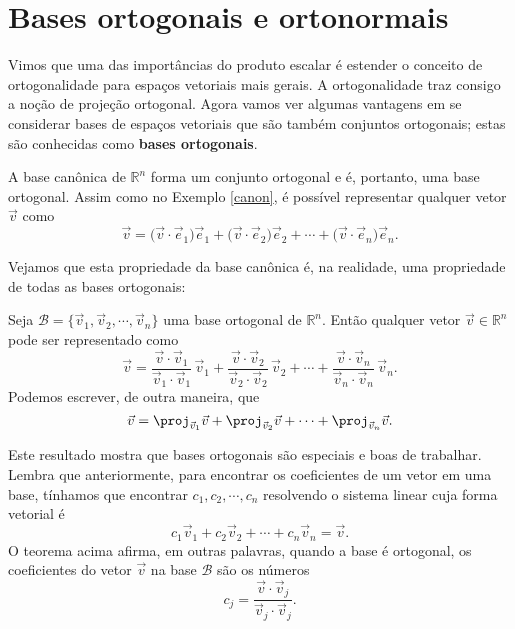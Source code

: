 \construirExer

\section{Bases ortogonais e ortonormais}


Vimos que uma das importâncias do produto escalar é estender o conceito de ortogonalidade para espaços vetoriais mais gerais. A ortogonalidade traz consigo a noção de projeção ortogonal. Agora vamos ver algumas vantagens em se considerar bases de espaços vetoriais que são também conjuntos ortogonais; estas são conhecidas como \textbf{bases ortogonais}.

\begin{ex}\label{ortonormal}
	A base canônica de $\mathbb{R}^n$ forma um conjunto ortogonal e é, portanto, uma base ortogonal. Assim como no Exemplo \ref{canon}, é possível representar qualquer vetor $\vec{v}$ como
	\begin{equation}
	\vec{v} = \big( \vec{v} \cdot \vec{e}_1 \big) \vec{e}_1 + \big( \vec{v} \cdot \vec{e}_2 \big) \vec{e}_2  + \cdots  + \big( \vec{v} \cdot \vec{e}_n \big) \vec{e}_n.
	\end{equation}
\end{ex}

Vejamos que esta propriedade da base canônica é, na realidade, uma propriedade de todas as bases ortogonais:

\begin{teo}\label{thm:base-ortogonal}
	Seja $\mathcal{B} = \{ \vec{v}_1, \vec{v}_2, \cdots, \vec{v}_n\}$ uma base ortogonal de $\mathbb{R}^n$. Então qualquer vetor $\vec{v} \in \mathbb{R}^n$ pode ser representado como
	\begin{equation}
	\vec{v} = \frac{\vec{v} \cdot \vec{v}_1}{\vec{v}_1 \cdot \vec{v}_1} \, \vec{v}_1 + \frac{\vec{v} \cdot \vec{v}_2}{\vec{v}_2 \cdot \vec{v}_2} \, \vec{v}_2  + \cdots  + \frac{\vec{v} \cdot \vec{v}_n}{\vec{v}_n \cdot \vec{v}_n} \, \vec{v}_n.
	\end{equation} Podemos escrever, de outra maneira, que
	\begin{equation}
	\vec{v} = \proj_{\vec{v}_1} \vec{v} +  \proj_{\vec{v}_2} \vec{v}  + \cdots  + \proj_{\vec{v}_n} \vec{v}.
	\end{equation}
\end{teo}

Este resultado mostra que bases ortogonais são especiais e boas de trabalhar. Lembra que anteriormente, para encontrar os coeficientes de um vetor em uma base, tínhamos que encontrar $c_1, c_2, \cdots, c_n$ resolvendo o sistema linear cuja forma vetorial é
\begin{equation}
c_1 \vec{v}_1 + c_2 \vec{v}_2 + \cdots + c_n \vec{v}_n = \vec{v}.
\end{equation} O teorema acima afirma, em outras palavras, quando a base é ortogonal, os coeficientes do vetor $\vec{v}$ na base $\mathcal{B}$ são os números
\begin{equation}
c_j = \frac{\vec{v} \cdot \vec{v}_j}{\vec{v}_j \cdot \vec{v}_j}.
\end{equation}


